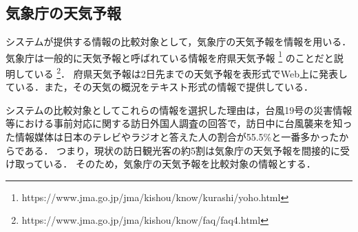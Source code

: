 \subsection{気象庁の天気予報}
システムが提供する情報の比較対象として，気象庁の天気予報を情報を用いる．
気象庁は一般的に天気予報と呼ばれている情報を府県天気予報 \footnote{https://www.jma.go.jp/jma/kishou/know/kurashi/yoho.html} のことだと説明している \footnote{https://www.jma.go.jp/jma/kishou/know/faq/faq4.html}．
府県天気予報は2日先までの天気予報を表形式でWeb上に発表している．また，その天気の概況をテキスト形式の情報で提供している．\par
システムの比較対象としてこれらの情報を選択した理由は，台風19号の災害情報等における事前対応に関する訪日外国人調査\cite{Typhoon}の回答で，訪日中に台風襲来を知った情報媒体は日本のテレビやラジオと答えた人の割合が55.5\%と一番多かったからである．
つまり，現状の訪日観光客の約5割は気象庁の天気予報を間接的に受け取っている．
そのため，気象庁の天気予報を比較対象の情報とする．
